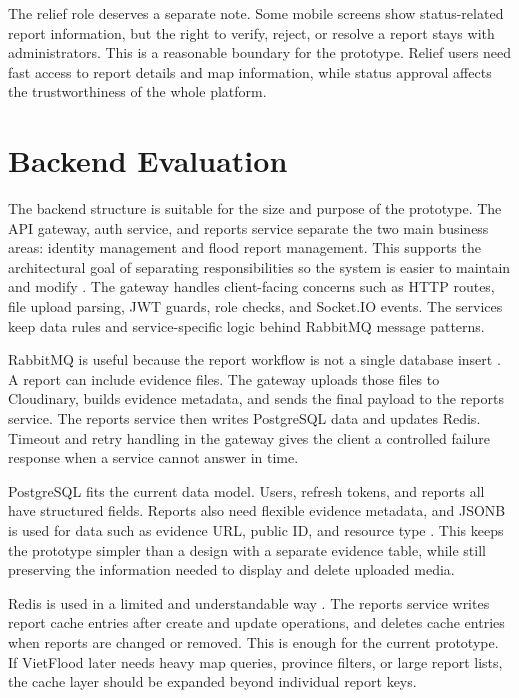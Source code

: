 The relief role deserves a separate note. Some mobile screens show status-related report information, but the right to verify, reject, or resolve a report stays with administrators. This is a reasonable boundary for the prototype. Relief users need fast access to report details and map information, while status approval affects the trustworthiness of the whole platform.

\section{Backend Evaluation}

The backend structure is suitable for the size and purpose of the prototype. The API gateway, auth service, and reports service separate the two main business areas: identity management and flood report management. This supports the architectural goal of separating responsibilities so the system is easier to maintain and modify \cite{bass2021softwareArchitecture}. The gateway handles client-facing concerns such as HTTP routes, file upload parsing, JWT guards, role checks, and Socket.IO events. The services keep data rules and service-specific logic behind RabbitMQ message patterns.

RabbitMQ is useful because the report workflow is not a single database insert \cite{rabbitmqConfirmsDocs}. A report can include evidence files. The gateway uploads those files to Cloudinary, builds evidence metadata, and sends the final payload to the reports service. The reports service then writes PostgreSQL data and updates Redis. Timeout and retry handling in the gateway gives the client a controlled failure response when a service cannot answer in time.

PostgreSQL fits the current data model. Users, refresh tokens, and reports all have structured fields. Reports also need flexible evidence metadata, and JSONB is used for data such as evidence URL, public ID, and resource type \cite{postgresqlJsonDocs}. This keeps the prototype simpler than a design with a separate evidence table, while still preserving the information needed to display and delete uploaded media.

Redis is used in a limited and understandable way \cite{redisDocs}. The reports service writes report cache entries after create and update operations, and deletes cache entries when reports are changed or removed. This is enough for the current prototype. If VietFlood later needs heavy map queries, province filters, or large report lists, the cache layer should be expanded beyond individual report keys.

